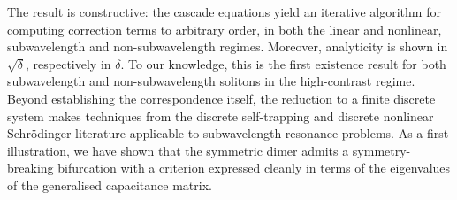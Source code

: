\documentclass[a4paper,reqno,twoside]{amsart}
\numberwithin{equation}{section}
\theoremstyle{definition}
\newcommand{\<}{\ensuremath \leq}
\renewcommand{\>}{\ensuremath \geq}
\begin{document}
The result is constructive: the cascade equations yield an iterative 
algorithm for computing correction terms to arbitrary order, in both 
the linear and nonlinear, subwavelength and non-subwavelength regimes. Moreover, analyticity is shown in $\sqrt{\delta}$, respectively in $\delta$. To 
our knowledge, this is the first existence result for both subwavelength 
and non-subwavelength solitons in the high-contrast regime. Beyond 
establishing the correspondence itself, the reduction to a finite 
discrete system makes techniques from the discrete self-trapping and 
discrete nonlinear Schr\"odinger literature applicable to subwavelength 
resonance problems. As a first illustration, we have shown that the 
symmetric dimer admits a symmetry-breaking bifurcation with a criterion 
expressed cleanly in terms of the eigenvalues of the generalised 
capacitance matrix.






    
\end{document}
